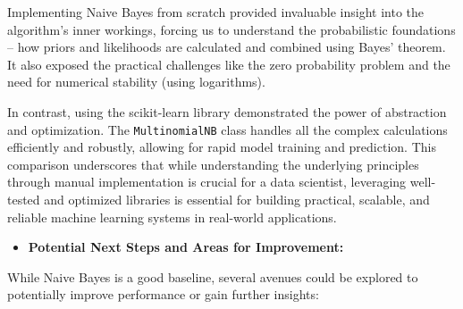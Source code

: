 \documentclass[12pt,a4paper]{article}
\begin{document}
Implementing Naive Bayes from scratch provided invaluable insight into the algorithm's inner workings, forcing us to understand the probabilistic foundations – how priors and likelihoods are calculated and combined using Bayes' theorem. It also exposed the practical challenges like the zero probability problem and the need for numerical stability (using logarithms).

In contrast, using the scikit-learn library demonstrated the power of abstraction and optimization. The \texttt{MultinomialNB} class handles all the complex calculations efficiently and robustly, allowing for rapid model training and prediction. This comparison underscores that while understanding the underlying principles through manual implementation is crucial for a data scientist, leveraging well-tested and optimized libraries is essential for building practical, scalable, and reliable machine learning systems in real-world applications.

\begin{itemize}
    \item \textbf{Potential Next Steps and Areas for Improvement:}
\end{itemize}

While Naive Bayes is a good baseline, several avenues could be explored to potentially improve performance or gain further insights:
\end{document}
